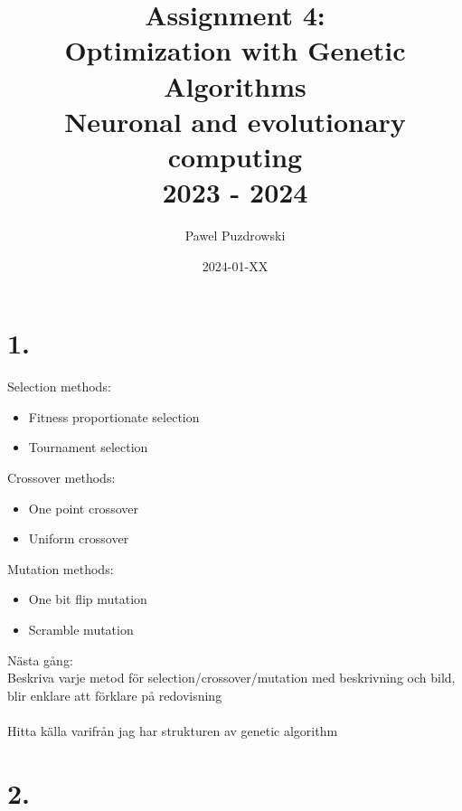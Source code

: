 \documentclass[12pt]{report}
\title{Assignment 4: \\ Optimization with Genetic Algorithms \\ Neuronal and evolutionary computing\\ 2023 - 2024}
\author{Pawel Puzdrowski}
\date{2024-01-XX}
\begin{document}
    \maketitle
    \tableofcontents
    \newpage
    \section{1.}
    Selection methods: \\
    \begin{itemize}
        \item Fitness proportionate selection 
        \item Tournament selection
    \end{itemize}
    Crossover methods: \\
    \begin{itemize}
        \item One point crossover
        \item Uniform crossover
    \end{itemize}
    Mutation methods: \\
    \begin{itemize}
        \item One bit flip mutation
        \item Scramble mutation
    \end{itemize}
    Nästa gång:\\
    Beskriva varje metod för selection/crossover/mutation med beskrivning och bild, blir enklare att förklare på redovisning\\
    \\
    Hitta källa varifrån jag har strukturen av genetic algorithm

    \newpage
    \section{2.}
    



\end{document}
